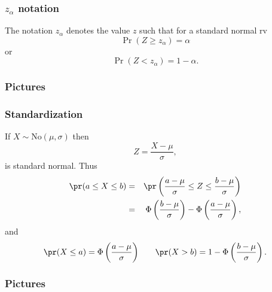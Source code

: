 \begin{frame}[fragile]\frametitle{$z_{\alpha}$ notation}

\begin{defn}
The notation $z_{\alpha}$ denotes the value $z$ such that for
a standard normal rv 
$$\Pr(Z \geq z_{\alpha}) = \alpha$$ 
or
$$\Pr(Z < z_{\alpha}) = 1-\alpha.$$
\end{defn}
\end{frame}


\begin{frame}[fragile]\frametitle{Pictures}


\end{frame}





\begin{frame}[fragile]\frametitle{Standardization}

If $X \sim \mbox{No}(\mu,\sigma)$ then 
$$Z=\frac{X-\mu}{\sigma},$$
is standard normal.  Thus
\begin{eqnarray*}
\pr(a \leq X \leq b)& =& \pr\left(\frac{a-\mu}{\sigma} \leq Z \leq 
\frac{b-\mu}{\sigma}\right) \\ 
& = & \Phi\left(\frac{b-\mu}{\sigma}\right)-\Phi\left(\frac{a-\mu}{\sigma}\right), 
\end{eqnarray*}
and
$$ \pr(X \leq a ) = \Phi\left(\frac{a-\mu}{\sigma}\right) \, \, \, \,
\, \, \, \, \, \, \, 
\pr(X > b) = 1-\Phi\left(\frac{b-\mu}{\sigma}\right).$$
\end{frame}



\begin{frame}[fragile]\frametitle{Pictures}


\end{frame}







